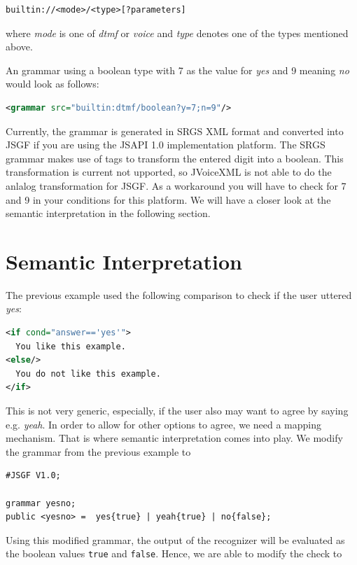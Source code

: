 \documentclass[11pt,a4paper]{article}
\begin{document}
\begin{lstlisting}
builtin://<mode>/<type>[?parameters]
\end{lstlisting}

where \emph{mode} is one of \emph{dtmf} or \emph{voice} and \emph{type} denotes
one of the types mentioned above.

An grammar using a boolean type with 7 as the value for \emph{yes} and 9
meaning \emph{no} would look as follows:

\begin{lstlisting}[language=XML]
<grammar src="builtin:dtmf/boolean?y=7;n=9"/>
\end{lstlisting}

Currently, the grammar is generated in SRGS XML format and converted into JSGF
if you are using the JSAPI 1.0 implementation platform. The SRGS grammar
makes use of tags to transform the entered digit into a boolean. This
transformation is current not upported, so JVoiceXML is not able to do the
anlalog transformation for JSGF. As a workaround you will have to check for 7
and 9 in your conditions for this platform. We will have a closer look at the
semantic interpretation in the following section.

\section{Semantic Interpretation}
\label{sec:semantic-interpretation}

The previous example used the following comparison to check if the user uttered
\emph{yes}:

\begin{lstlisting}[language=XML]
<if cond="answer=='yes'">
  You like this example.
<else/>
  You do not like this example.
</if>
\end{lstlisting}

This is not very generic, especially, if the user also may want to agree by
saying e.g. \emph{yeah}. In order to allow for other options to agree, we need
a mapping mechanism. That is where semantic interpretation comes into play. We
modify the grammar from the previous example to

\begin{lstlisting}
#JSGF V1.0;

grammar yesno;
public <yesno> =  yes{true} | yeah{true} | no{false};
\end{lstlisting}

Using this modified grammar, the output of the recognizer will be evaluated
as the boolean values \lstinline{true} and \lstinline{false}. Hence, we are
able to modify the check to
\end{document}

